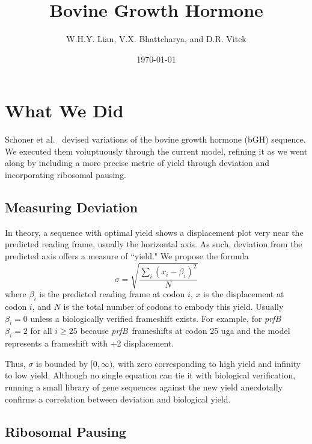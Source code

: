 \documentclass[10pt,twocolumn]{article}
\newcommand{\prfB}{\emph{prfB}}
\begin{document}
\title{{\bf Bovine Growth Hormone}}
\author{{\sc W.H.Y. Lian, V.X. Bhattcharya, and D.R. Vitek}}
\date{{\sc \today}}
\maketitle

\section{What We Did}
\label{whatwedid}

Schoner et al.~\cite{schoner:bgh} devised variations of the bovine growth hormone (bGH) sequence.
We executed them voluptuously through the current model, refining it as we went along by including
a more precise metric of yield through deviation and incorporating ribosomal pausing.

\subsection{Measuring Deviation}
\label{whatwedid:lbd}

In theory, a sequence with optimal yield shows a displacement plot very near the predicted reading frame,
usually the horizontal axis. As such, deviation from the predicted axis offers a measure of ``yield."
We propose the formula
\begin{equation}
    \label{eqn:lbd}
    \sigma = \sqrt{\frac{\sum_i \left(x_i - \beta_i\right)^2}{N}}
\end{equation}
where $\beta_i$ is the predicted reading frame at codon $i$, $x$ is the displacement at codon $i$,
and $N$ is the total number of codons to embody this yield. Usually $\beta_i = 0$ unless a biologically verified frameshift exists. For example, for \prfB\ $\beta_i = 2$ for all $i \geq 25$ because \prfB\ frameshifts at codon 25 uga
and the model represents a frameshift with +2 displacement.

Thus, $\sigma$ is bounded by $[0,\infty)$, with zero corresponding to high yield and infinity to low yield.
Although no single equation can tie it with biological verification, running a small library of gene sequences
against the new yield anecdotally confirms a correlation between deviation and biological yield.

\subsection{Ribosomal Pausing}
\label{rp}
\end{document}
